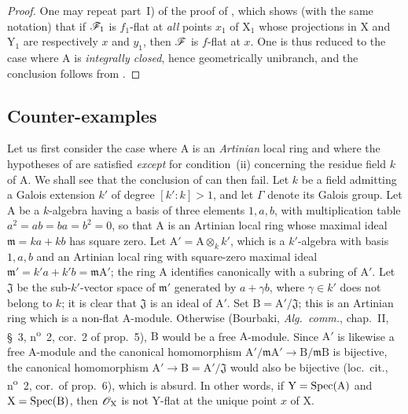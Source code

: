 \begin{proof}
One may repeat part~I) of the proof of , which shows (with the same notation) that if $\mathscr{F}_1$ is $f_1$-flat at \emph{all} points $x_1$ of $\mathrm{X}_1$ whose projections in $\mathrm{X}$ and $\mathrm{Y}_1$ are respectively $x$ and $y_1$, then $\mathscr{F}$ is $f$-flat at $x$.
One is thus reduced to the case where $\mathrm{A}$ is \emph{integrally closed}, hence geometrically unibranch, and the conclusion follows from .
\end{proof}

\subsection{Counter-examples}
\label{subsection:IV.11.7}

\begin{env}[11.7.1]
\label{IV.11.7.1}
Let us first consider the case where $\mathrm{A}$ is an \emph{Artinian} local ring and where the hypotheses of  are satisfied \emph{except} for condition~(ii) concerning the residue field $k$ of $\mathrm{A}$. We shall see that the conclusion of  can then fail.
Let $k$ be a field admitting a Galois extension $k'$ of degree $[k':k]>1$, and let $\Gamma$ denote its Galois group.
Let $\mathrm{A}$ be a $k$-algebra having a basis of three elements $1,a,b$, with multiplication table $a^2=ab=ba=b^2=0$, so that $\mathrm{A}$ is an Artinian local ring whose maximal ideal $\mathfrak{m}=ka+kb$ has square zero.
Let $\mathrm{A}'=\mathrm{A}\otimes_k k'$, which is a $k'$-algebra with basis $1,a,b$ and an Artinian local ring with square-zero maximal ideal $\mathfrak{m}'=k'a+k'b=\mathfrak{m}\mathrm{A}'$; the ring $\mathrm{A}$ identifies canonically with a subring of $\mathrm{A}'$.
Let $\mathfrak{J}$ be the sub-$k'$-vector space of $\mathfrak{m}'$ generated by $a+\gamma b$, where $\gamma\in k'$ does not belong to $k$; it is clear that $\mathfrak{J}$ is an ideal of $\mathrm{A}'$.
Set $\mathrm{B}=\mathrm{A}'/\mathfrak{J}$; this is an Artinian ring which is a non-flat $\mathrm{A}$-module. Otherwise (Bourbaki, \emph{Alg.\ comm.}, chap.~II, \S~3, n\textsuperscript{o}~2, cor.~2 of prop.~5), $\mathrm{B}$ would be a free $\mathrm{A}$-module. Since $\mathrm{A}'$ is likewise a free $\mathrm{A}$-module and the canonical homomorphism $\mathrm{A}'/\mathfrak{m}\mathrm{A}'\to\mathrm{B}/\mathfrak{m}\mathrm{B}$ is bijective, the canonical homomorphism $\mathrm{A}'\to\mathrm{B}=\mathrm{A}'/\mathfrak{J}$ would also
be bijective (loc.~cit., n\textsuperscript{o}~2, cor.~of prop.~6), which is absurd. In other words, if $\mathrm{Y}=\operatorname{Spec}(\mathrm{A})$ and $\mathrm{X}=\operatorname{Spec}(\mathrm{B})$, then $\mathscr{O}_\mathrm{X}$ is not $\mathrm{Y}$-flat at the unique point $x$ of $\mathrm{X}$.

\end{env}
